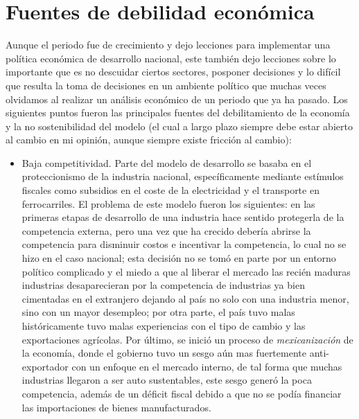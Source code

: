 \section{Fuentes de debilidad económica}
Aunque el periodo fue de crecimiento y dejo lecciones para implementar una política económica de desarrollo nacional, este también dejo lecciones sobre lo importante que es no descuidar ciertos sectores, posponer decisiones y lo difícil que resulta la toma de decisiones en un ambiente político que muchas veces olvidamos al realizar un análisis económico de un periodo que ya ha pasado.
Los siguientes puntos fueron las principales fuentes del debilitamiento de la economía y la no sostenibilidad del modelo (el cual a largo plazo siempre debe estar abierto al cambio en mi opinión, aunque siempre existe fricción al cambio):
\begin{itemize}
    \item Baja competitividad. Parte del modelo de desarrollo se basaba en el proteccionismo de la industria nacional, específicamente mediante estímulos fiscales como subsidios en el coste de la electricidad y el transporte en ferrocarriles. El problema de este modelo fueron los siguientes: en las primeras etapas de desarrollo de una industria hace sentido protegerla de la competencia externa, pero una vez que ha crecido debería abrirse la competencia para disminuir costos e incentivar la competencia, lo cual no se hizo en el caso nacional; esta decisión no se tomó en parte por un entorno político complicado y el miedo a que al liberar el mercado las recién maduras industrias desaparecieran por la competencia de industrias ya bien cimentadas en el extranjero dejando al país no solo con una industria menor, sino con un mayor desempleo; por otra parte, el país tuvo malas históricamente tuvo malas experiencias con el tipo de cambio y las exportaciones agrícolas. Por último, se inició un proceso de \textit{mexicanización} de la economía, donde el gobierno tuvo un sesgo aún mas fuertemente anti-exportador con un enfoque en el mercado interno, de tal forma que muchas industrias llegaron a ser auto sustentables, este sesgo generó la poca competencia, además de un déficit fiscal debido a que no se podía financiar las importaciones de bienes manufacturados.

\end{itemize}
